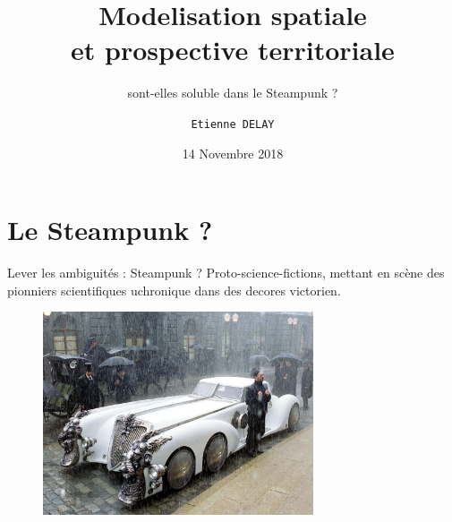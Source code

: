 \documentclass[newPxFont]{beamer}
\title{Modelisation spatiale \\et prospective territoriale}
\subtitle{sont-elles soluble dans le Steampunk ?}
\date{14 Novembre 2018}
\author{\texttt{Etienne DELAY}}
\institute{UR GREEN}
\begin{document}
%
%

\maketitle


%
%

\section{Le Steampunk ?}


\begin{frame}[c]{Lever les ambiguités : Steampunk ? }
  \vspace{-1cm}
  Proto-science-fictions, mettant en scène des pionniers scientifiques uchronique dans des decores victorien.
  \begin{figure}
    \includegraphics[height=6cm]{img/a_steampunk_car.jpg}
  \end{figure}
\end{frame}
\end{document}
